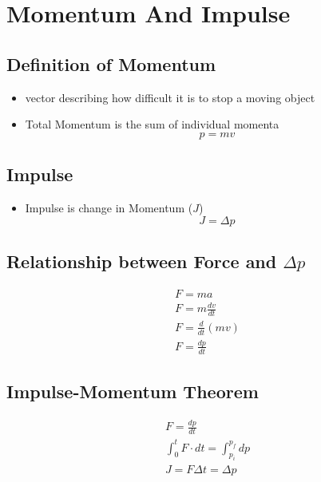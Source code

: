 \documentclass[../Notes.tex]{subfiles}
\begin{document}
    \section{Momentum And Impulse}
    
    \subsection{Definition of Momentum}
    \begin{itemize}
        \item vector describing how difficult it is to stop a moving object
        \item Total Momentum is the sum of individual momenta
        \begin{equation*}
            p = mv
        \end{equation*}
    \end{itemize}

    \subsection{Impulse}
    \begin{itemize}
        \item Impulse is change in Momentum ($J$)
        \begin{equation*}
            J = \Delta p
        \end{equation*}
    \end{itemize}

    \subsection{Relationship between Force and $\Delta p$}
    \begin{align*}
        F = ma \\
        F = m \frac{dv}{dt} \\
        F = \frac{d}{dt}(mv) \\
        F = \frac{dp}{dt}
    \end{align*}

    \subsection{Impulse-Momentum Theorem}
    \begin{align*}
        F = \frac{dp}{dt} \\
        \int_0^t F \cdot dt = \int_{p_i}^{p_f} dp \\
        J = F \Delta t = \Delta p
    \end{align*}
\end{document}
